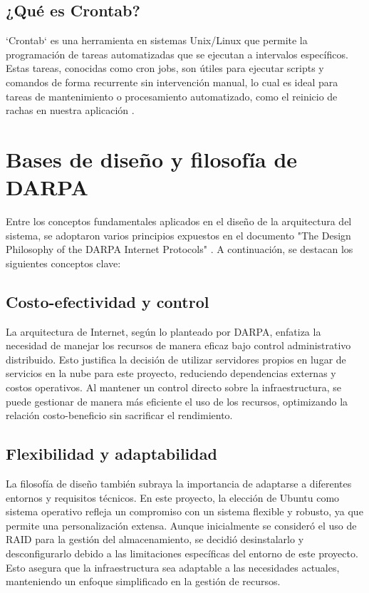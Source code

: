 \subsection{¿Qué es Crontab?}
`Crontab` es una herramienta en sistemas Unix/Linux que permite la programación de tareas automatizadas que se ejecutan a intervalos específicos. Estas tareas, conocidas como cron jobs, son útiles para ejecutar scripts y comandos de forma recurrente sin intervención manual, lo cual es ideal para tareas de mantenimiento o procesamiento automatizado, como el reinicio de rachas en nuestra aplicación \cite{HostingerCrontabTutorial}.

\section{Bases de diseño y filosofía de DARPA}
Entre los conceptos fundamentales aplicados en el diseño de la arquitectura del sistema, se adoptaron varios principios expuestos en el documento "The Design Philosophy of the DARPA Internet Protocols" \cite{DARPA}. A continuación, se destacan los siguientes conceptos clave:

\subsection{Costo-efectividad y control}
La arquitectura de Internet, según lo planteado por DARPA, enfatiza la necesidad de manejar los recursos de manera eficaz bajo control administrativo distribuido. Esto justifica la decisión de utilizar servidores propios en lugar de servicios en la nube para este proyecto, reduciendo dependencias externas y costos operativos. Al mantener un control directo sobre la infraestructura, se puede gestionar de manera más eficiente el uso de los recursos, optimizando la relación costo-beneficio sin sacrificar el rendimiento.

\subsection{Flexibilidad y adaptabilidad}
La filosofía de diseño también subraya la importancia de adaptarse a diferentes entornos y requisitos técnicos. En este proyecto, la elección de Ubuntu como sistema operativo refleja un compromiso con un sistema flexible y robusto, ya que permite una personalización extensa. Aunque inicialmente se consideró el uso de RAID para la gestión del almacenamiento, se decidió desinstalarlo y desconfigurarlo debido a las limitaciones específicas del entorno de este proyecto. Esto asegura que la infraestructura sea adaptable a las necesidades actuales, manteniendo un enfoque simplificado en la gestión de recursos.

